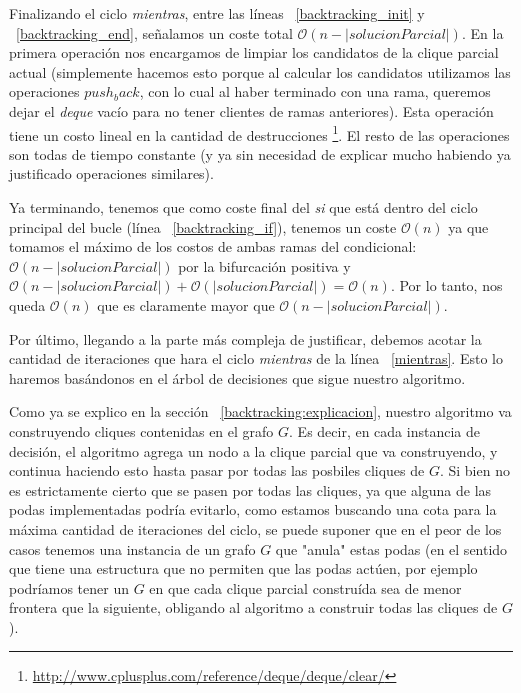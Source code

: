 \par Finalizando el ciclo \emph{mientras}, entre las l\'ineas ~\ref{backtracking_init} y
    ~\ref{backtracking_end}, se\~nalamos un coste total $\mathcal O(n -|solucionParcial|)$.
    En la primera operaci\'on nos encargamos de limpiar los candidatos de la clique
    parcial actual (simplemente hacemos esto porque al calcular los candidatos
    utilizamos las operaciones $push_back$, con lo cual al haber terminado con una rama,
    queremos dejar el \emph{deque} vac\'io para no tener clientes de ramas
    anteriores). Esta operaci\'on tiene un costo lineal en la cantidad de destrucciones%
    \footnote{\url{http://www.cplusplus.com/reference/deque/deque/clear/}}. El resto
    de las operaciones son todas de tiempo constante (y ya sin necesidad de explicar
    mucho habiendo ya justificado operaciones similares).

\par Ya terminando, tenemos que como coste final del \emph{si} que est\'a dentro
    del ciclo principal del bucle (l\'inea ~\ref{backtracking_if}), tenemos un
    coste $\mathcal O(n)$ ya que tomamos el m\'aximo de los costos de ambas
    ramas del condicional: $\mathcal O(n-|solucionParcial|)$ por la bifurcaci\'on
    positiva y $\mathcal O(n-|solucionParcial|) + \mathcal O(|solucionParcial|) =
    \mathcal O(n)$. Por lo tanto, nos queda $\mathcal O(n)$ que es claramente
    mayor que $\mathcal O(n-|solucionParcial|)$.

\par Por \'ultimo, llegando a la parte m\'as compleja de justificar, debemos
    acotar la cantidad de iteraciones que hara el ciclo \emph{mientras} de la
    l\'inea ~\ref{mientras}. Esto lo haremos bas\'andonos en el \'arbol de
    decisiones que sigue nuestro algoritmo.

\par Como ya se explico en la secci\'on ~\ref{backtracking:explicacion}, nuestro
    algoritmo va construyendo cliques contenidas en el grafo $G$. Es decir, en cada
    instancia de decisi\'on, el algoritmo agrega un nodo a la clique parcial que va
    construyendo, y continua haciendo esto hasta pasar por todas las posbiles
    cliques de $G$. Si bien no es estrictamente cierto que se pasen por todas las cliques,
    ya que alguna de las podas implementadas podr\'ia evitarlo,
    como estamos buscando una cota para la m\'axima cantidad de iteraciones
    del ciclo, se puede suponer que en el peor de los casos tenemos una instancia
    de un grafo $G$ que "anula" estas podas (en el sentido que tiene una estructura
    que no permiten que las podas act\'uen, por ejemplo podr\'iamos tener un $G$ en
    que cada clique parcial constru\'ida sea de menor frontera que la siguiente,
    obligando al algoritmo a construir todas las cliques de $G$).

